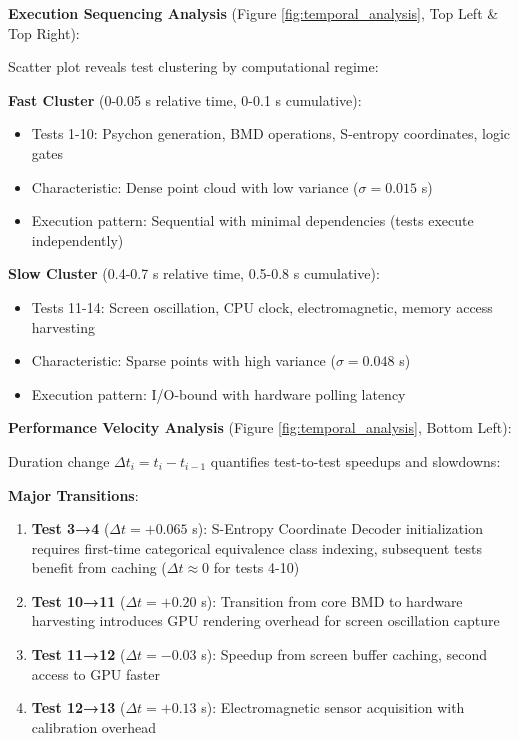 \documentclass[11pt,a4paper]{article}
\begin{document}
\textbf{Execution Sequencing Analysis} (Figure \ref{fig:temporal_analysis}, Top Left & Top Right):

Scatter plot reveals test clustering by computational regime:

\textbf{Fast Cluster} (0-0.05 s relative time, 0-0.1 s cumulative):
\begin{itemize}
\item Tests 1-10: Psychon generation, BMD operations, S-entropy coordinates, logic gates
\item Characteristic: Dense point cloud with low variance ($\sigma = 0.015$ s)
\item Execution pattern: Sequential with minimal dependencies (tests execute independently)
\end{itemize}

\textbf{Slow Cluster} (0.4-0.7 s relative time, 0.5-0.8 s cumulative):
\begin{itemize}
\item Tests 11-14: Screen oscillation, CPU clock, electromagnetic, memory access harvesting
\item Characteristic: Sparse points with high variance ($\sigma = 0.048$ s)
\item Execution pattern: I/O-bound with hardware polling latency
\end{itemize}

\textbf{Performance Velocity Analysis} (Figure \ref{fig:temporal_analysis}, Bottom Left):

Duration change $\Delta t_i = t_i - t_{i-1}$ quantifies test-to-test speedups and slowdowns:

\textbf{Major Transitions}:
\begin{enumerate}
\item \textbf{Test 3→4} ($\Delta t = +0.065$ s): S-Entropy Coordinate Decoder initialization requires first-time categorical equivalence class indexing, subsequent tests benefit from caching ($\Delta t \approx 0$ for tests 4-10)
\item \textbf{Test 10→11} ($\Delta t = +0.20$ s): Transition from core BMD to hardware harvesting introduces GPU rendering overhead for screen oscillation capture
\item \textbf{Test 11→12} ($\Delta t = -0.03$ s): Speedup from screen buffer caching, second access to GPU faster
\item \textbf{Test 12→13} ($\Delta t = +0.13$ s): Electromagnetic sensor acquisition with calibration overhead
\end{enumerate}
\end{document}
